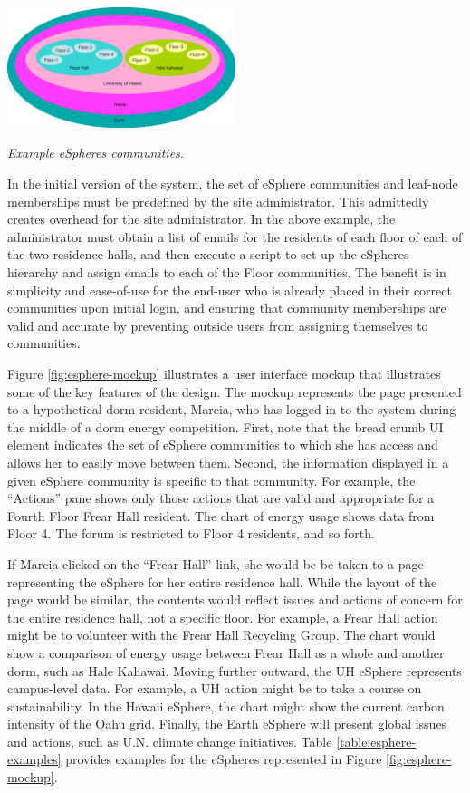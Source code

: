 \begin{floatingfigure}[l]{3.25in}
 \center
  \includegraphics[width=0.5\textwidth]{espheres.eps}
  \caption{\em \small Example eSpheres communities.}
 \label{fig:espheres}
\end{floatingfigure} 

In the initial version of the system, the set of eSphere communities and
leaf-node memberships must be predefined by the site administrator. This
admittedly creates overhead for the site administrator. In the above
example, the administrator must obtain a list of emails for the residents
of each floor of each of the two residence halls, and then execute a script
to set up the eSpheres hierarchy and assign emails to each of the Floor
communities. The benefit is in simplicity and ease-of-use for the end-user
who is already placed in their correct communities upon initial login, 
and ensuring that community memberships are valid and accurate by
preventing outside users from assigning themselves to communities.

Figure \ref{fig:esphere-mockup} illustrates a user interface mockup that
illustrates some of the key features of the design.  The mockup represents
the page presented to a hypothetical dorm resident, Marcia, who has logged
in to the system during the middle of a dorm energy competition.  First,
note that the bread crumb UI element indicates the set of eSphere
communities to which she has access and allows her to easily move between
them.  Second, the information displayed in a given eSphere community is
specific to that community.  For example, the ``Actions'' pane shows only
those actions that are valid and appropriate for a Fourth Floor Frear Hall
resident.  The chart of energy usage shows data from Floor 4.  The forum is
restricted to Floor 4 residents, and so forth.  

If Marcia clicked on the ``Frear Hall'' link, she would be be taken to a
page representing the eSphere for her entire residence hall.  While the
layout of the page would be similar, the contents would reflect issues and
actions of concern for the entire residence hall, not a specific floor. 
For example, a Frear Hall action might be to volunteer with the Frear Hall
Recycling Group.   The chart would show a comparison of energy usage
between Frear Hall as a whole and another dorm, such as Hale Kahawai. 
Moving further outward, the UH eSphere represents campus-level data. For
example, a UH action might be to take a course on sustainability.  
In the Hawaii eSphere, the chart might show the current carbon intensity of
the Oahu grid.  Finally, the Earth eSphere will present global issues and
actions, such as U.N. climate change initiatives. Table
\ref{table:esphere-examples} provides examples for the eSpheres represented
in Figure \ref{fig:esphere-mockup}.

